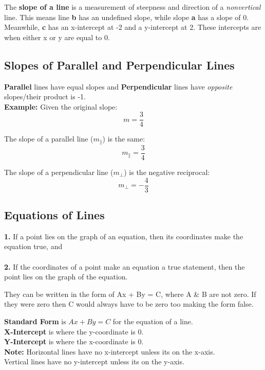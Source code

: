 The \textbf{slope of a line} is a measurement of steepness and direction of a \textit{nonvertical} line. This means line \textbf{b} has an undefined slope, while slope \textbf{a} has a slope of 0.
Meanwhile, \textbf{c} has an x-intercept at -2 and a y-intercept at 2. These intercepts are when either x or y are equal to 0.

\newpage
\subsection{Slopes of Parallel and Perpendicular Lines}
\textbf{Parallel} lines have equal slopes and \textbf{Perpendicular} lines have \textit{opposite} slopes/their product is -1. \\

\textbf{Example:} 
Given the original slope:
$$m = \frac{3}{4}$$

The slope of a parallel line ($m_{\parallel}$) is the same:
$$m_{\parallel} = \frac{3}{4}$$

The slope of a perpendicular line ($m_{\perp}$) is the negative reciprocal:
$$m_{\perp} = -\frac{4}{3}$$

\subsection{Equations of Lines}
\textbf{1.} If a point lies on the graph of an equation, then its coordinates make the equation true, and \\\\
\textbf{2.} If the coordinates of a point make an equation a true statement, then the point lies on the graph of the equation.

They can be written in the form of Ax + By = C, where A \& B are not zero. If they were zero then C would always have to be zero too making the form false.

\textbf{Standard Form} is $Ax + By = C$ for the equation of a line. \\
\textbf{X-Intercept} is where the y-coordinate is 0. \\
\textbf{Y-Intercept} is where the x-coordinate is 0. \\

\textbf{Note:} Horizontal lines have no x-intercept unless its on the x-axis.\\Vertical lines have no y-intercept unless its on the y-axis.

